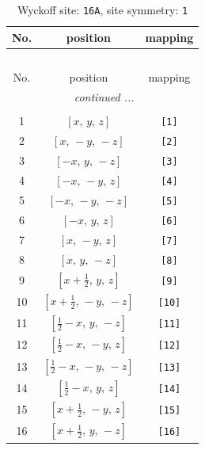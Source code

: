 \documentclass[fleqn,8pt]{jsarticle}
\begin{document}
\begin{longtable}{ccc}
\caption{Wyckoff site: {\tt 16A}, site symmetry: {\tt 1}}
 \\
 \hline \hline
No. & position & mapping \\ \hline \endfirsthead

\multicolumn{2}{l}{\tablename\ \thetable{}} \\
 \hline \hline
No. & position & mapping \\ \hline \endhead

 \hline \hline
\multicolumn{2}{r}{\footnotesize\it continued ...} \\ \endfoot

 \hline \hline
\multicolumn{2}{r}{} \\ \endlastfoot

1 & $\left[ x,\, y,\, z \right]$ & {\tt [1]} \\ \hline
2 & $\left[ x,\, - y,\, - z \right]$ & {\tt [2]} \\ \hline
3 & $\left[ - x,\, y,\, - z \right]$ & {\tt [3]} \\ \hline
4 & $\left[ - x,\, - y,\, z \right]$ & {\tt [4]} \\ \hline
5 & $\left[ - x,\, - y,\, - z \right]$ & {\tt [5]} \\ \hline
6 & $\left[ - x,\, y,\, z \right]$ & {\tt [6]} \\ \hline
7 & $\left[ x,\, - y,\, z \right]$ & {\tt [7]} \\ \hline
8 & $\left[ x,\, y,\, - z \right]$ & {\tt [8]} \\ \hline
9 & $\left[ x + \frac{1}{2},\, y,\, z \right]$ & {\tt [9]} \\ \hline
10 & $\left[ x + \frac{1}{2},\, - y,\, - z \right]$ & {\tt [10]} \\ \hline
11 & $\left[ \frac{1}{2} - x,\, y,\, - z \right]$ & {\tt [11]} \\ \hline
12 & $\left[ \frac{1}{2} - x,\, - y,\, z \right]$ & {\tt [12]} \\ \hline
13 & $\left[ \frac{1}{2} - x,\, - y,\, - z \right]$ & {\tt [13]} \\ \hline
14 & $\left[ \frac{1}{2} - x,\, y,\, z \right]$ & {\tt [14]} \\ \hline
15 & $\left[ x + \frac{1}{2},\, - y,\, z \right]$ & {\tt [15]} \\ \hline
16 & $\left[ x + \frac{1}{2},\, y,\, - z \right]$ & {\tt [16]} \\
\end{longtable}
\end{document}
